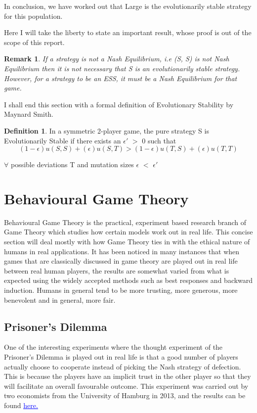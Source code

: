 \documentclass[11pt]{article}
\newtheorem*{remark}{Remark}
\theoremstyle{definition}
\newtheorem*{definition}{Definition}
\begin{document}
In conclusion, we have worked out that Large is the evolutionarily stable strategy for this population.

Here I will take the liberty to state an important result, whose proof is out of the scope of this report. 
\begin{remark}
If a strategy is not a Nash Equilibrium, i.e (S, S) is not Nash Equilibrium then it is not necessary that S is an evolutionarily stable strategy. However, for a strategy to be an ESS, it must be a Nash Equilibrium for that game.
\end{remark}

I shall end this section with a formal definition of Evolutionary Stability by Maynard Smith.
\begin{definition}
In a symmetric 2-player game, the pure strategy S is Evolutionarily Stable if there exists an $\epsilon'$ $>$ 0 such that 
\[
(1-\epsilon)u(S,S) + (\epsilon)u(S,T) > (1-\epsilon)u(T,S) + (\epsilon)u(T,T) 
\]
\begin{center}
$\forall$ possible deviations T and mutation sizes $\epsilon$ $<$ $\epsilon'$
\end{center}
\end{definition}

\section{Behavioural Game Theory}

Behavioural Game Theory is the practical, experiment based research branch of Game Theory which studies how certain models work out in real life. This concise section will deal mostly with how Game Theory ties in with the ethical nature of humans in real applications. It has been noticed in many instances that when games that are classically discussed in game theory are played out in real life between real human players, the results are somewhat varied from what is expected using the widely accepted methods such as best responses and backward induction. Humans in general tend to be more trusting, more generous, more benevolent and in general, more fair.

\subsection{Prisoner's Dilemma}

One of the interesting experiments where the thought experiment of the Prisoner's Dilemma is played out in real life is that a good number of players actually choose to cooperate instead of picking the Nash strategy of defection. This is because the players have an implicit trust in the other player so that they will facilitate an overall favourable outcome. This experiment was carried out by two economists from the University of Hamburg in 2013, and the results can be found \href{https://www.sciencedirect.com/science/article/abs/pii/S0167268113001522}{\textcolor{blue}{\underline{here.}}}
\end{document}
